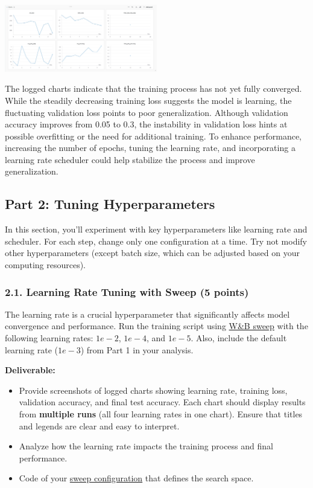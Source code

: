 \documentclass[11pt, oneside]{article}   	%
\begin{document}
\begin{center}
    \includegraphics[width=0.5\textwidth]{report_pic/Logged_Charts.png}
\end{center}

The logged charts indicate that the training process has not yet fully converged. While the steadily decreasing training loss suggests the model is learning, the fluctuating validation loss points to poor generalization. Although validation accuracy improves from 0.05 to 0.3, the instability in validation loss hints at possible overfitting or the need for additional training. To enhance performance, increasing the number of epochs, tuning the learning rate, and incorporating a learning rate scheduler could help stabilize the process and improve generalization.

\subsection*{Part 2: Tuning Hyperparameters}
In this section, you'll experiment with key hyperparameters like learning rate and scheduler. For each step, change only one configuration at a time. Try not modify other hyperparameters (except batch size, which can be adjusted based on your computing resources).

\subsubsection*{2.1. Learning Rate Tuning with Sweep (5 points)}
 The learning rate is a crucial hyperparameter that significantly affects model convergence and performance.  Run the training script using \href{https://docs.wandb.ai/guides/sweeps/walkthrough}{W\&B sweep} with the following learning rates: $1e-2$, $1e-4$, and $1e-5$. Also, include the default learning rate ($1e-3$) from Part 1 in your analysis.

\noindent\textbf{Deliverable:}
\begin{itemize}
    \item Provide screenshots of logged charts showing learning rate, training loss, validation accuracy, and final test accuracy. Each chart should display results from \textbf{multiple runs} (all four learning rates in one chart). Ensure that titles and legends are clear and easy to interpret.
    \item Analyze how the learning rate impacts the training process and final performance.
    \item Code of your \href{https://docs.wandb.ai/guides/sweeps/define-sweep-configuration}{sweep configuration} that defines the search space.
\end{itemize}
\end{document}

